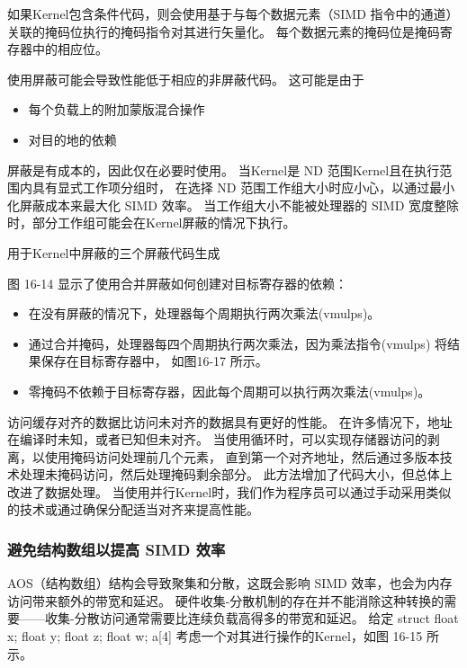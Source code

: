 如果Kernel包含条件代码，则会使用基于与每个数据元素（SIMD 指令中的通道）关联的掩码位执行的掩码指令对其进行矢量化。 
每个数据元素的掩码位是掩码寄存器中的相应位。

使用屏蔽可能会导致性能低于相应的非屏蔽代码。 这可能是由于

\begin{itemize}
	\item 每个负载上的附加蒙版混合操作

	\item 对目的地的依赖
\end{itemize}

屏蔽是有成本的，因此仅在必要时使用。 当Kernel是 ND 范围Kernel且在执行范围内具有显式工作项分组时，
在选择 ND 范围工作组大小时应小心，以通过最小化屏蔽成本来最大化 SIMD 效率。 
当工作组大小不能被处理器的 SIMD 宽度整除时，部分工作组可能会在Kernel屏蔽的情况下执行。

{\color{red} 用于Kernel中屏蔽的三个屏蔽代码生成}

图 16-14 显示了使用合并屏蔽如何创建对目标寄存器的依赖：

\begin{itemize}
	\item 在没有屏蔽的情况下，处理器每个周期执行两次乘法(vmulps)。

	\item 通过合并掩码，处理器每四个周期执行两次乘法，因为乘法指令(vmulps) 将结果保存在目标寄存器中，
	如图16-17 所示。

	\item 零掩码不依赖于目标寄存器，因此每个周期可以执行两次乘法(vmulps)。
\end{itemize}

访问缓存对齐的数据比访问未对齐的数据具有更好的性能。 在许多情况下，地址在编译时未知，或者已知但未对齐。 
当使用循环时，可以实现存储器访问的剥离，以使用掩码访问处理前几个元素，
直到第一个对齐地址，然后通过多版本技术处理未掩码访问，然后处理掩码剩余部分。 
此方法增加了代码大小，但总体上改进了数据处理。 
当使用并行Kernel时，我们作为程序员可以通过手动采用类似的技术或通过确保分配适当对齐来提高性能。

\subsubsection{避免结构数组以提高 SIMD 效率}
AOS（结构数组）结构会导致聚集和分散，这既会影响 SIMD 效率，也会为内存访问带来额外的带宽和延迟。 
硬件收集-分散机制的存在并不能消除这种转换的需要——收集-分散访问通常需要比连续负载高得多的带宽和延迟。 
给定 struct {float x; float y; float z; float w;} a[4]
考虑一个对其进行操作的Kernel，如图 16-15 所示。

